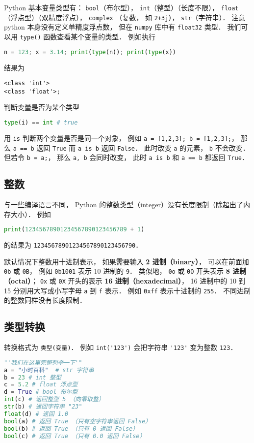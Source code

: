 
\begin{issues}
\issueDraft
\end{issues}


Python 基本变量类型有： \verb|bool|（布尔型）， \verb|int|（整型）（长度不限）， \verb|float|（浮点型）（双精度浮点）， \verb|complex| （复数， 如 \verb|2+3j|）， \verb|str|（字符串）． 注意 python 本身没有定义单精度浮点数， 但在 \verb|numpy| 库中有 \verb|float32| 类型． 我们可以用 \verb|type()| 函数查看某个变量的类型． 例如执行
\begin{lstlisting}[language=python]
n = 123; x = 3.14; print(type(n)); print(type(x))
\end{lstlisting}
结果为
\begin{lstlisting}[language=none]
<class 'int'>
<class 'float'>;
\end{lstlisting}
判断变量是否为某个类型
\begin{lstlisting}[language=python]
type(i) == int # true
\end{lstlisting}

用 \verb|is| 判断两个变量是否是同一个对象， 例如 \verb|a = [1,2,3]; b = [1,2,3];|， 那么 \verb|a == b| 返回 \verb|True| 而 \verb|a is b| 返回 \verb|False|． 此时改变 \verb|a| 的元素， \verb|b| 不会改变． 但若令 \verb|b = a;|， 那么 \verb|a, b| 会同时改变， 此时 \verb|a is b| 和 \verb|a == b| 都返回 \verb|True|．

\subsection{整数}
与一些编译语言不同， Python 的整数类型（integer）没有长度限制（除超出了内存大小）． 例如
\begin{lstlisting}[language=python]
print(12345678901234567890123456789 + 1)
\end{lstlisting}
的结果为 \verb|12345678901234567890123456790|．

默认情况下整数用十进制表示， 如果需要输入 \textbf{2 进制（binary）}， 可以在前面加 \verb|0b| 或 \verb|0B|， 例如 \verb|0b1001| 表示 10 进制的 \verb|9|． 类似地， \verb|0o| 或 \verb|0O| 开头表示 \textbf{8 进制（octal）}； \verb|0x| 或 \verb|0X| 开头的表示 \textbf{16 进制（hexadecimal）}， 16 进制中的 10 到 15 分别用大写或小写字母 \verb|a| 到 \verb|f| 表示． 例如 \verb|0xff| 表示十进制的 \verb|255|． 不同进制的整数同样没有长度限制．

\subsection{类型转换}
转换格式为 \verb|类型(变量)|． 例如 \verb|int('123')| 会把字符串 \verb|'123'| 变为整数 \verb|123|．
\begin{lstlisting}[language=python]
"'我们在这里完整列举一下'"
a = "小时百科"  # str 字符串
b = 23 # int 整型
c = 5.2 # float 浮点型
d = True # bool 布尔型
int(c) # 返回整型 5 （向零取整）
str(b) # 返回字符串 "23"
float(d) # 返回 1.0
bool(a) # 返回 True （只有空字符串返回 False）
bool(b) # 返回 True （只有 0 返回 False）
bool(c) # 返回 True （只有 0.0 返回 False）
\end{lstlisting}

